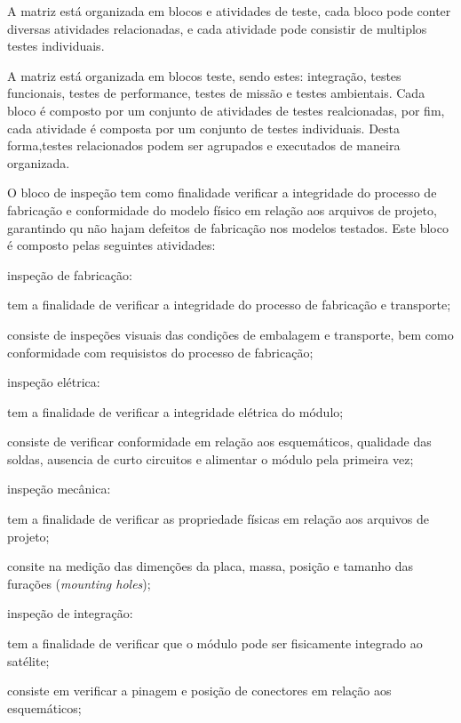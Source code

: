 A matriz está organizada em blocos e atividades de teste, cada bloco pode conter diversas atividades relacionadas, e cada atividade pode consistir de multiplos testes individuais.

A matriz está organizada em blocos teste, sendo estes: integração, testes funcionais, testes de performance, testes de missão e testes ambientais.
Cada bloco é composto por um conjunto de atividades de testes realcionadas, por fim, cada atividade é composta por um conjunto de testes individuais.
Desta forma,testes relacionados podem ser agrupados e executados de maneira organizada.

O bloco de inspeção tem como finalidade verificar a integridade do processo de fabricação e conformidade do modelo físico em relação aos arquivos de projeto, garantindo qu não hajam defeitos de fabricação nos modelos testados.
Este bloco é composto pelas seguintes atividades:

\begin{alineas}
    \item inspeção de fabricação:
    \begin{alineas}
        \item tem a finalidade de verificar a integridade do processo de fabricação e transporte;
        \item consiste de inspeções visuais das condições de embalagem e transporte, bem como conformidade com requisistos do processo de fabricação;
    \end{alineas}

    \item inspeção elétrica:
    \begin{alineas}
        \item tem a finalidade de verificar a integridade elétrica do módulo;
        \item consiste de verificar conformidade em relação aos esquemáticos, qualidade das soldas, ausencia de curto circuitos e alimentar o módulo pela primeira vez;
    \end{alineas}

    \item inspeção mecânica:
    \begin{alineas}
        \item tem a finalidade de verificar as propriedade físicas em relação aos arquivos de projeto;
        \item consite na medição das dimenções da placa, massa, posição e tamanho das furações (\textit{mounting holes});
    \end{alineas}

    \item inspeção de integração:
    \begin{alineas}
        \item tem a finalidade de verificar que o módulo pode ser fisicamente integrado ao satélite;
        \item consiste em verificar a pinagem e posição de conectores em relação aos esquemáticos;
    \end{alineas}
\end{alineas}


